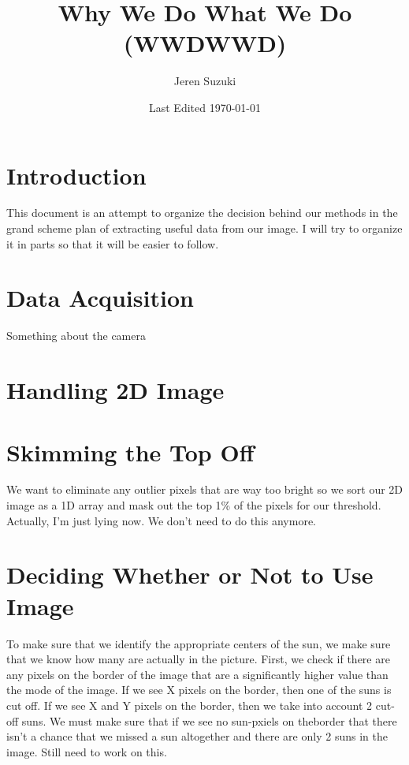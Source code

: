 \documentclass[10pt]{article}
\title{Why We Do What We Do (WWDWWD)}
\author{Jeren Suzuki}
\date{Last Edited \today}
\begin{document}
\maketitle
{}
\tableofcontents
{}
\clearpage
{}

\section*{Introduction} %
\label{sec:introduction}
    This document is an attempt to organize the decision behind our methods in the grand scheme plan of extracting useful data from our image. I will try to organize it in parts so that it will be easier to follow.

\section{Data Acquisition} %
\label{sec:data_acquisition}
Something about the camera

\section{Handling 2D Image} %
\label{sec:handling_2d_image}

\section{Skimming the Top Off} %
\label{sec:skimming_the_top_off}
We want to eliminate any outlier pixels that are way too bright so we sort our 2D image as a 1D array and mask out the top 1\% of the pixels for our threshold. Actually, I'm just lying now. We don't need to do this anymore.

\section{Deciding Whether or Not to Use Image} %
\label{sec:deciding_whether_or_not_to_use_image}
To make sure that we identify the appropriate centers of the sun, we make sure that we know how many are actually in the picture. First, we check if there are any pixels on the border of the image that are a significantly higher value than the mode of the image. If we see X pixels on the border, then one of the suns is cut off. If we see X and Y pixels on the border, then we take into account 2 cut-off suns. We must make sure that if we see no sun-pxiels on theborder that there isn't a chance that we missed a sun altogether and there are only 2 suns in the image. Still need to work on this.
\end{document}
